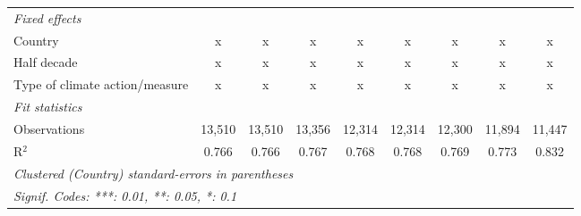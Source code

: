 \begin{table}[htbp]
\begin{tabular}{lcccccccc}
      \emph{Fixed effects}\\
      Country                                                                 & x       & x       & x           & x             & x             & x             & x             & x\\  
      Half decade                                                             & x       & x       & x           & x             & x             & x             & x             & x\\  
      Type of climate action/measure                                          & x       & x       & x           & x             & x             & x             & x             & x\\  
      \midrule \emph{Fit statistics}\\
      Observations                                                            & 13,510  & 13,510  & 13,356      & 12,314        & 12,314        & 12,300        & 11,894        & 11,447\\  
      R$^2$                                                                   & 0.766   & 0.766   & 0.767       & 0.768         & 0.768         & 0.769         & 0.773         & 0.832\\  
      \midrule
      \multicolumn{9}{l}{\emph{Clustered (Country) standard-errors in parentheses}}\\
      \multicolumn{9}{l}{\emph{Signif. Codes: ***: 0.01, **: 0.05, *: 0.1}}\\
   \end{tabular}
\end{table}



